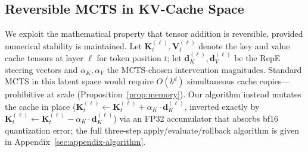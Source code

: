 \documentclass{article}
\begin{document}

\subsection{Reversible MCTS in KV-Cache Space}

We exploit the mathematical property that tensor addition is reversible, provided numerical stability is maintained. Let $\mathbf{K}_t^{(\ell)}, \mathbf{V}_t^{(\ell)}$ denote the key and value cache tensors at layer $\ell$ for token position $t$; let $\mathbf{d}_K^{(\ell)}, \mathbf{d}_V^{(\ell)}$ be the RepE steering vectors and $\alpha_K, \alpha_V$ the MCTS-chosen intervention magnitudes. Standard MCTS in this latent space would require $O(b^d)$ simultaneous cache copies---prohibitive at scale (Proposition~\ref{prop:memory}). Our algorithm instead mutates the cache in place ($\mathbf{K}_t^{(\ell)} \leftarrow \mathbf{K}_t^{(\ell)} + \alpha_K \cdot \mathbf{d}_K^{(\ell)}$, inverted exactly by $\mathbf{K}_t^{(\ell)} \leftarrow \mathbf{K}_t^{(\ell)} - \alpha_K \cdot \mathbf{d}_K^{(\ell)}$) via an FP32 accumulator that absorbs bf16 quantization error; the full three-step apply/evaluate/rollback algorithm is given in Appendix~\ref{sec:appendix-algorithm}.
\end{document}

